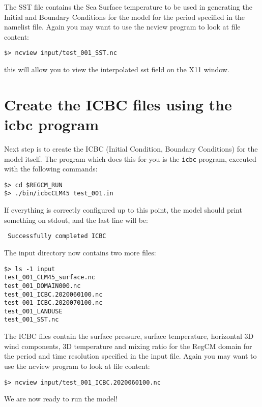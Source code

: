 The SST file contains the Sea Surface temperature to be used in generating the
Initial and Boundary Conditions for the model for the period specified in the
namelist file. Again you may want to use the ncview program to look at
file content:

\begin{Verbatim}
$> ncview input/test_001_SST.nc
\end{Verbatim}

this will allow you to view the interpolated sst field on the X11 window.

\section{Create the ICBC files using the icbc program}

Next step is to create the ICBC (Initial Condition, Boundary Conditions) for
the model itself. The program which does this for you is the \verb=icbc=
program, executed with the following commands:

\begin{Verbatim}
$> cd $REGCM_RUN
$> ./bin/icbcCLM45 test_001.in
\end{Verbatim}

If everything is correctly configured up to this point, the model should print
something on stdout, and the last line will be:

\begin{Verbatim}
 Successfully completed ICBC
\end{Verbatim}

The input directory now contains two more files:

\begin{Verbatim}
$> ls -1 input
test_001_CLM45_surface.nc
test_001_DOMAIN000.nc
test_001_ICBC.2020060100.nc
test_001_ICBC.2020070100.nc
test_001_LANDUSE
test_001_SST.nc
\end{Verbatim}

The ICBC files contain the surface pressure, surface temperature, horizontal
3D wind components, 3D temperature and mixing ratio for the RegCM domain for the
period and time resolution specified in the input file.
Again you may want to use the ncview program to look at file content:

\begin{Verbatim}
$> ncview input/test_001_ICBC.2020060100.nc
\end{Verbatim}

We are now ready to run the model!

